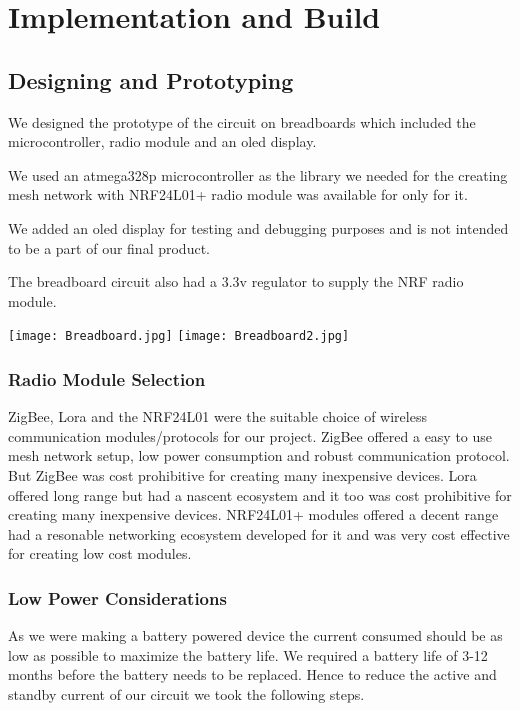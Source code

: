 \chapter{Implementation and Build}

\section{Designing and Prototyping}
We designed the prototype of the circuit on breadboards which included the microcontroller, radio module and an oled display.

We used an atmega328p microcontroller as the library we needed for the creating mesh network with NRF24L01+ radio module was available for only for it.

We added an oled display for testing and debugging purposes and is not intended to be a part of our final product.

The breadboard circuit also had a 3.3v regulator to supply the NRF radio module. 

\texttt{[image: Breadboard.jpg]}
\texttt{[image: Breadboard2.jpg]}

\subsection{Radio Module Selection}
ZigBee, Lora and the NRF24L01 were the suitable choice of wireless communication modules/protocols for our project.
ZigBee offered a easy to use mesh network setup, low power consumption and robust communication protocol. But ZigBee was cost prohibitive for creating many inexpensive devices. 
Lora offered long range but had a nascent ecosystem and it too was cost prohibitive for creating many inexpensive devices. 
NRF24L01+ modules offered a decent range had a resonable networking ecosystem developed for it and was very cost effective for creating low cost modules.


\subsection{Low Power Considerations}
As we were making a battery powered device the current consumed should be as low as possible to maximize the battery life.
We required a battery life of 3-12 months before the battery needs to be replaced. Hence to reduce the active and standby current of our circuit we took the following steps.

